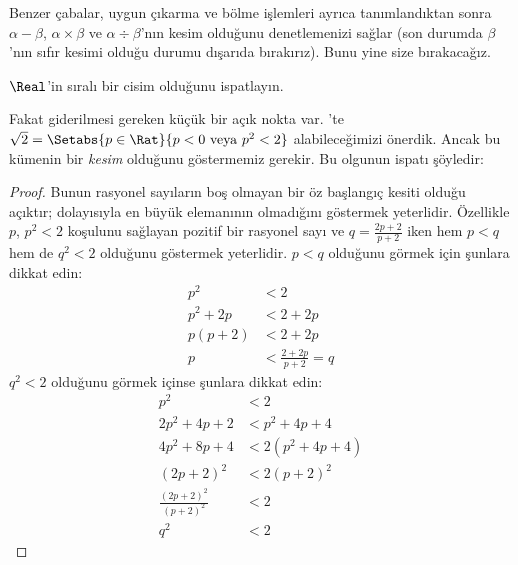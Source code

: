 Benzer çabalar, uygun çıkarma ve bölme işlemleri ayrıca tanımlandıktan sonra
$\alpha - \beta$, $\alpha \times \beta$ ve $\alpha \div \beta$'nın kesim
olduğunu denetlemenizi sağlar (son durumda $\beta$'nın sıfır kesimi olduğu
durumu dışarıda bırakırız). Bunu yine size bırakacağız.

\begin{prob}
$\Real$'in sıralı bir cisim olduğunu ispatlayın.
\end{prob}

Fakat giderilmesi gereken küçük bir açık nokta var. 'te
$\sqrt{2} = \Setabs{p \in \Rat}{p < 0 \text{ veya }p^2 < 2}$
alabileceğimizi önerdik. Ancak bu kümenin bir \emph{kesim} olduğunu
göstermemiz gerekir. Bu olgunun ispatı şöyledir:

\begin{proof}
Bunun rasyonel sayıların boş olmayan bir öz başlangıç kesiti olduğu açıktır;
dolayısıyla en büyük elemanının olmadığını göstermek yeterlidir. Özellikle
$p$, $p^2 < 2$ koşulunu sağlayan pozitif bir rasyonel sayı ve
$q = \frac{2p+2}{p+2}$ iken hem $p < q$ hem de $q^2 < 2$ olduğunu göstermek
yeterlidir. $p < q$ olduğunu görmek için şunlara dikkat edin:
\begin{align*}
	p^2 &< 2\\
	p^2 + 2p &< 2 + 2p\\
	p(p + 2) &< 2 + 2p\\
	p &< \tfrac{2+2p}{p+2} = q
\end{align*}
$q^2 < 2$ olduğunu görmek içinse şunlara dikkat edin:
\begin{align*}
	p^2 &< 2\\
	2p^2 + 4p + 2 &< p^2 + 4p+ 4\\
	4p^2 + 8p + 4 &< 2(p^2 + 4p + 4)\\
	(2p+2)^2 & <2(p+2)^2\\
	\tfrac{(2p+2)^2}{(p+2)^2} &< 2\\
	q^2 &< 2
\end{align*}
\end{proof}
